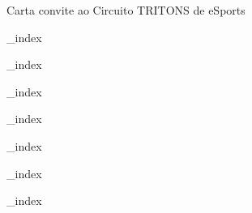 \documentclass[a4paper,12pt]{article}
\begin{document}


\begin{center}

\huge{Carta convite ao Circuito TRITONS de eSports}

\end{center}



{_index}


{_index}


{_index}


{_index}




{_index}


{_index}


{_index}
\end{document}
